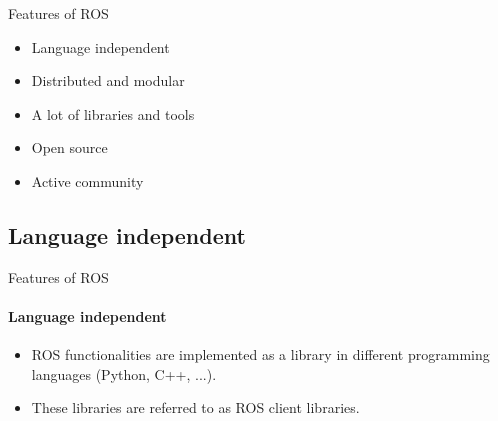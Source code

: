 \documentclass{beamer}
\begin{document}
\begin{frame}{Features of ROS}

\begin{itemize}
        \item Language independent
        \item Distributed and modular
        \item A lot of libraries and tools
        \item Open source
        \item Active community
\end{itemize}
\end{frame}

\subsection{Language independent}
\begin{frame}{Features of ROS}
\framesubtitle{Language independent}    
\begin{itemize}
    \item ROS functionalities are implemented as a library in different programming languages (Python, C++, ...).
    \item  These libraries are referred to as ROS client libraries.
\end{itemize}
\end{frame}
\end{document}
